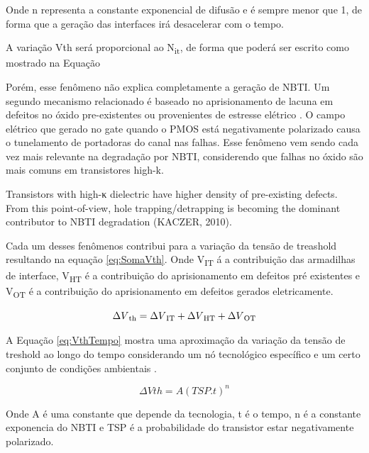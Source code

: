 Onde n representa a constante exponencial de difusão e é sempre menor que 1, de forma que a geração das interfaces irá desacelerar com o tempo.

A variação Vth será proporcional ao N\textsubscript{it}, de forma que poderá ser escrito como mostrado na Equação

Porém, esse fenômeno não explica completamente a geração de NBTI. Um segundo mecanismo relacionado é baseado no aprisionamento de lacuna em defeitos no óxido pre-existentes ou provenientes de estresse elétrico \cite{Butzen}. O campo elétrico que gerado no gate quando o PMOS está negativamente polarizado causa o tunelamento de portadoras do canal nas falhas. Esse fenômeno vem sendo cada vez mais relevante na degradação por NBTI, considerendo que falhas no óxido são mais comuns em transistores high-k.

Transistors with high-κ dielectric have higher density of pre-existing defects. From this point-of-view, hole trapping/detrapping is becoming the dominant contributor to NBTI degradation (KACZER, 2010).

Cada um desses fenômenos contribui para a variação da tensão de treashold resultando na equação \ref{eq:SomaVth}. Onde V\textsubscript{IT} á a contribuição das armadilhas de interface, V\textsubscript{HT} é a contribuição do aprisionamento em defeitos pré existentes e V\textsubscript{OT} é a contribuição do aprisionamento em defeitos gerados eletricamente.

\begin{equation}
    \label{eq:SomaVth}
    \Delta V{\textsubscript {th}} = \Delta V{\textsubscript {IT}} + \Delta V{\textsubscript {HT}} + \Delta V{\textsubscript {OT}}
\end{equation}

A Equação \ref{eq:VthTempo} mostra uma aproximação da variação da tensão de treshold ao longo do tempo considerando um nó tecnológico específico e um certo conjunto de condições ambientais \cite{Butzen}.

\begin{equation}
    \label{eq:VthTempo}
    \Delta Vth = A(TSP.t)^n
\end{equation}

Onde A é uma constante que depende da tecnologia, t é o tempo, n é a constante exponencia do NBTI e TSP é a probabilidade do transistor estar negativamente polarizado.